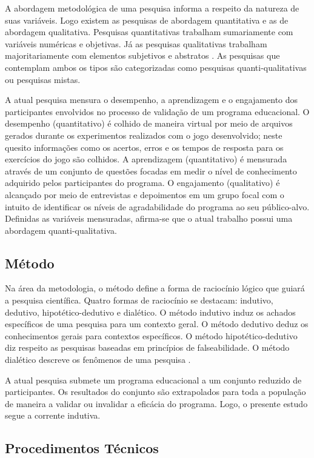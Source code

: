 A abordagem metodológica de uma pesquisa informa a respeito da natureza de suas variáveis. Logo existem as pesquisas de abordagem quantitativa e as de abordagem qualitativa. Pesquisas quantitativas trabalham sumariamente com variáveis numéricas e objetivas. Já as pesquisas qualitativas trabalham majoritariamente com elementos subjetivos e abstratos \cite{carlos2002elaborar}. As pesquisas que contemplam ambos os tipos são categorizadas como pesquisas quanti-qualitativas ou pesquisas mistas. 

A atual pesquisa mensura o desempenho, a aprendizagem e o engajamento dos participantes envolvidos no processo de validação de um programa educacional. O desempenho (quantitativo) é colhido de maneira virtual por meio de arquivos gerados durante os experimentos realizados com o jogo desenvolvido; neste quesito informações como os acertos, erros e os tempos de resposta para os exercícios do jogo são colhidos. A aprendizagem (quantitativo) é mensurada através de um conjunto de questões focadas em medir o nível de conhecimento adquirido pelos participantes do programa. O engajamento (qualitativo) é alcançado por meio de entrevistas e depoimentos em um grupo focal com o intuito de identificar os níveis de agradabilidade do programa ao seu público-alvo. Definidas as variáveis mensuradas, afirma-se que o atual trabalho possui uma abordagem quanti-qualitativa. 

\subsection{Método}\label{sub:Metodo}

Na área da metodologia, o método define a forma de raciocínio lógico que guiará a pesquisa científica. Quatro formas de raciocínio se destacam: indutivo, dedutivo, hipotético-dedutivo e dialético. O método indutivo induz os achados específicos de uma pesquisa para um contexto geral. O método dedutivo deduz os conhecimentos gerais para contextos específicos. O método hipotético-dedutivo diz respeito as pesquisas baseadas em princípios de falseabilidade. O método dialético descreve os fenômenos de uma pesquisa \cite{marconi2003lakatos}.  

A atual pesquisa submete um programa educacional a um conjunto reduzido de participantes. Os resultados do conjunto são extrapolados para toda a população de maneira a validar ou invalidar a eficácia do programa. Logo, o presente estudo segue a corrente indutiva. 

\subsection{Procedimentos Técnicos}\label{sub:Procedimentos}

